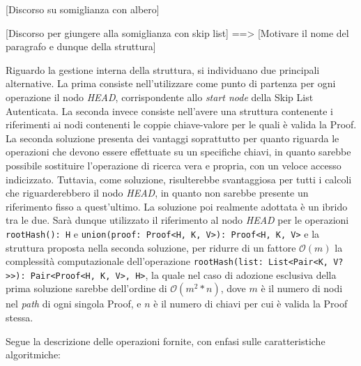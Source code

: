 		[Discorso su somiglianza con albero]
		
		[Discorso per giungere alla somiglianza con skip list] ==> [Motivare il nome del paragrafo e dunque della struttura]
		
		Riguardo la gestione interna della struttura, si individuano due principali alternative. La prima consiste nell'utilizzare come punto di partenza per ogni operazione il nodo \textit{HEAD}, corrispondente allo \textit{start node} della Skip List Autenticata. La seconda invece consiste nell'avere una struttura contenente i riferimenti ai nodi contenenti le coppie chiave-valore per le quali è valida la Proof. La seconda soluzione presenta dei vantaggi soprattutto per quanto riguarda le operazioni che devono essere effettuate su un specifiche chiavi, in quanto sarebbe possibile sostituire l'operazione di ricerca vera e propria, con un veloce accesso indicizzato. Tuttavia, come soluzione, risulterebbe svantaggiosa per tutti i calcoli che riguarderebbero il nodo \textit{HEAD}, in quanto non sarebbe presente un riferimento fisso a quest'ultimo. La soluzione poi realmente adottata è un ibrido tra le due. Sarà dunque utilizzato il riferimento al nodo \textit{HEAD} per le operazioni \verb|rootHash(): H| e \verb|union(proof: Proof<H, K, V>): Proof<H, K, V>| e la struttura proposta nella seconda soluzione, per ridurre di un fattore $\mathcal{O}(m)$ la complessità computazionale dell'operazione \verb|rootHash(list: List<Pair<K, V?>>): Pair<Proof<H, K, V>, H>|, la quale nel caso di adozione esclusiva della prima soluzione sarebbe dell'ordine di $\mathcal{O}(m^{2}*n)$, dove $ m $ è il numero di nodi nel \textit{path} di ogni singola Proof, e $ n $ è il numero di chiavi per cui è valida la Proof stessa.
		
						
		Segue la descrizione delle operazioni fornite, con enfasi sulle caratteristiche algoritmiche:
		
